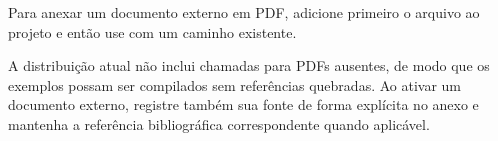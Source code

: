 \label{an:documento-pdf}

Para anexar um documento externo em PDF, adicione primeiro o arquivo ao projeto e então use \texttt{\string} com um caminho existente.

A distribuição atual não inclui chamadas para PDFs ausentes, de modo que os exemplos possam ser compilados sem referências quebradas. Ao ativar um documento externo, registre também sua fonte de forma explícita no anexo e mantenha a referência bibliográfica correspondente quando aplicável.
